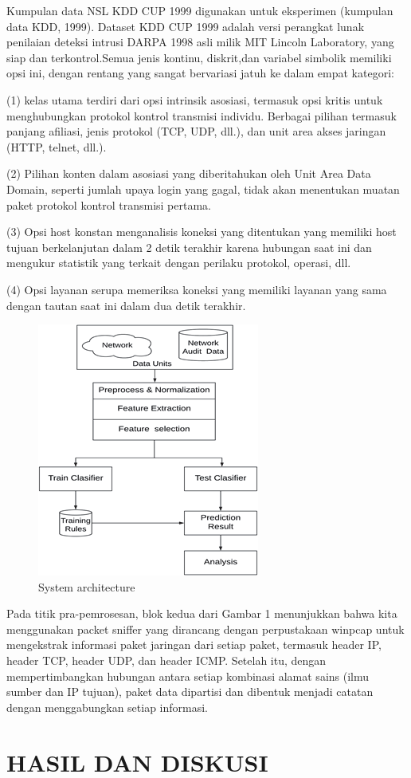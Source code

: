 \documentclass[conference]{IEEEtran}
\begin{document}
Kumpulan data NSL KDD CUP 1999 digunakan untuk eksperimen (kumpulan data KDD, 1999). Dataset KDD CUP 1999 adalah versi perangkat lunak penilaian deteksi intrusi DARPA 1998 asli milik MIT Lincoln Laboratory, yang siap dan terkontrol.Semua jenis kontinu, diskrit,dan variabel simbolik memiliki opsi ini, dengan rentang yang sangat bervariasi jatuh ke dalam empat kategori:

(1) kelas utama terdiri dari opsi intrinsik asosiasi, termasuk opsi kritis untuk menghubungkan protokol kontrol transmisi individu. Berbagai pilihan termasuk panjang afiliasi, jenis protokol (TCP, UDP, dll.), dan unit area akses jaringan (HTTP, telnet, dll.).

(2) Pilihan konten dalam asosiasi yang diberitahukan oleh Unit Area Data Domain, seperti jumlah upaya login yang gagal, tidak akan menentukan muatan paket protokol kontrol transmisi pertama. 

(3) Opsi host konstan menganalisis koneksi yang ditentukan yang memiliki host tujuan berkelanjutan dalam 2 detik terakhir karena hubungan saat ini dan mengukur statistik yang terkait dengan perilaku protokol, operasi, dll.

(4) Opsi layanan serupa memeriksa koneksi yang memiliki layanan yang sama dengan tautan saat ini dalam dua detik terakhir.

\begin{figure}
\centering
\includegraphics[width=.3\textwidth]{Gambar/pct1.png}
\caption{System architecture}
\end{figure}

Pada titik pra-pemrosesan, blok kedua dari Gambar 1 menunjukkan bahwa kita menggunakan packet sniffer yang dirancang dengan perpustakaan winpcap untuk mengekstrak informasi paket jaringan dari setiap paket, termasuk header IP, header TCP, header UDP, dan header ICMP. Setelah itu, dengan mempertimbangkan hubungan antara setiap kombinasi alamat sains (ilmu sumber dan IP tujuan), paket data dipartisi dan dibentuk menjadi catatan dengan menggabungkan setiap informasi.

\section{HASIL DAN DISKUSI}
\end{document}
